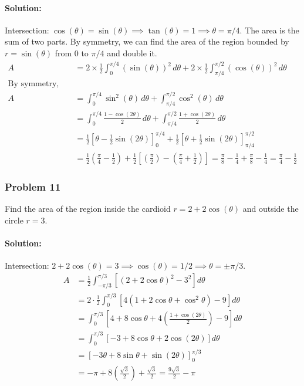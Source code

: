 \documentclass{article}
\begin{document}
\paragraph{Solution:}
Intersection: $\cos(\theta) = \sin(\theta) \implies \tan(\theta) = 1 \implies \theta = \pi/4$.
The area is the sum of two parts. By symmetry, we can find the area of the region bounded by $r=\sin(\theta)$ from $0$ to $\pi/4$ and double it.
\begin{align*} A &= 2 \times \frac{1}{2} \int_{0}^{\pi/4} (\sin(\theta))^2 \,d\theta + 2 \times \frac{1}{2} \int_{\pi/4}^{\pi/2} (\cos(\theta))^2 \,d\theta \\ \text{By symmetry, we can just calculate one and add:} \\ A &= \int_{0}^{\pi/4} \sin^2(\theta) \,d\theta + \int_{\pi/4}^{\pi/2} \cos^2(\theta) \,d\theta \\ &= \int_{0}^{\pi/4} \frac{1-\cos(2\theta)}{2} \,d\theta + \int_{\pi/4}^{\pi/2} \frac{1+\cos(2\theta)}{2} \,d\theta \\ &= \frac{1}{2}[\theta - \frac{1}{2}\sin(2\theta)]_{0}^{\pi/4} + \frac{1}{2}[\theta + \frac{1}{2}\sin(2\theta)]_{\pi/4}^{\pi/2} \\ &= \frac{1}{2}(\frac{\pi}{4} - \frac{1}{2}) + \frac{1}{2}[(\frac{\pi}{2}) - (\frac{\pi}{4} + \frac{1}{2})] = \frac{\pi}{8} - \frac{1}{4} + \frac{\pi}{8} - \frac{1}{4} = \frac{\pi}{4} - \frac{1}{2} \end{align*}

\subsubsection*{Problem 11}
Find the area of the region inside the cardioid $r=2+2\cos(\theta)$ and outside the circle $r=3$.
\paragraph{Solution:}
Intersection: $2+2\cos(\theta) = 3 \implies \cos(\theta)=1/2 \implies \theta = \pm \pi/3$.
\begin{align*} A &= \frac{1}{2} \int_{-\pi/3}^{\pi/3} [(2+2\cos\theta)^2 - 3^2] d\theta \\ &= 2 \cdot \frac{1}{2} \int_{0}^{\pi/3} [4(1+2\cos\theta+\cos^2\theta) - 9] d\theta \\ &= \int_{0}^{\pi/3} [4+8\cos\theta+4(\frac{1+\cos(2\theta)}{2}) - 9] d\theta \\ &= \int_{0}^{\pi/3} [-3 + 8\cos\theta + 2\cos(2\theta)] d\theta \\ &= [-3\theta + 8\sin\theta + \sin(2\theta)]_{0}^{\pi/3} \\ &= -\pi + 8(\frac{\sqrt{3}}{2}) + \frac{\sqrt{3}}{2} = \frac{9\sqrt{3}}{2} - \pi \end{align*}
\end{document}
